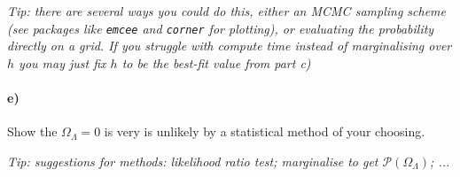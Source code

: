 \documentclass[12pt]{article}
\begin{document}
\emph{Tip: there are several ways you could do this, either an MCMC sampling scheme (see packages like \texttt{emcee} and \texttt{corner} for plotting), or evaluating the probability directly on a grid. If you struggle with compute time instead of marginalising over $h$ you may just fix $h$ to be the best-fit value from part c)}

\paragraph{e)}
Show the $\Omega_\Lambda = 0$ is very is unlikely by a statistical method of your choosing.

\emph{Tip: suggestions for methods: likelihood ratio test; marginalise to get $\mathcal{P}(\Omega_\Lambda)$; ...}
\end{document}
